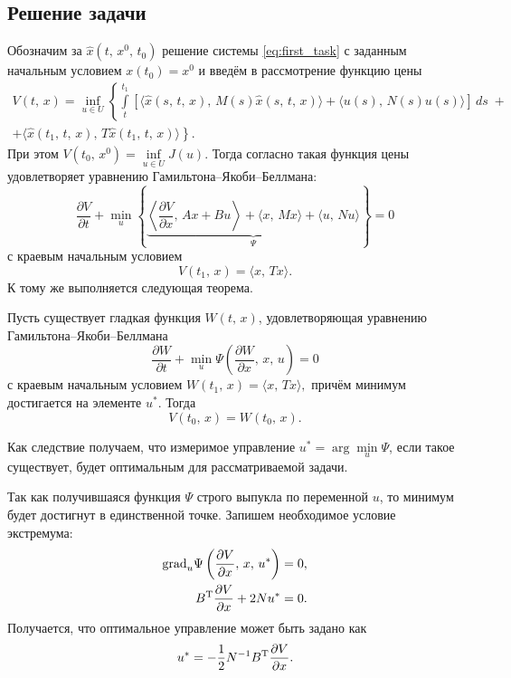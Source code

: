 \subsection{Решение задачи}
Обозначим за $\hat x(t,\,x^0,\,t_0)$ решение системы \eqref{eq:first_task} с заданным начальным условием $x(t_0) = x^0$ и введём в рассмотрение функцию цены
\begin{multline*}
        V(t,\,x)
=
\inf\limits_{u \in U} \left\{
        \int\limits_{t}^{t_1}
[
\langle
\hat x(s,\,t,\,x),\,M(s)\hat x(s,\,t,\,x)
\rangle
+
\langle
u(s),\,N(s)u(s)
\rangle
]\,ds
        \;+\right.\\+\left.
        \langle
        \hat x(t_1,\,t,\,x),\,T\hat x(t_1,\,t,\,x)
        \rangle
\right\}.
\end{multline*}
При этом $V(t_0,\,x^0) = \inf\limits_{u\in U} J(u)$. Тогда согласно \cite{krasovsky} такая функция цены удовлетворяет уравнению Гамильтона--Якоби--Беллмана:
\begin{equation}\label{eq:g-ya-b}
        \frac{\partial V}{\partial t}
        +
        \min\limits_{u}
        \left\{
        \underbrace{
\left\langle
\frac{\partial V}{\partial x}
,\,
Ax + Bu
\right\rangle
+
\langle
x,\,Mx
\rangle
+
\langle
u,\,Nu
\rangle
        }\limits_{\Psi}
        \right\}
        =
        0
\end{equation}
с краевым начальным условием
\begin{equation}\label{eq:g-ya-b-side}
        V(t_1,\,x)
        =
        \langle x,\,Tx \rangle.
\end{equation}
К тому же выполняется следующая теорема.
\begin{theorem}[О верификации]
        Пусть существует гладкая функция $W(t,\,x)$, удовлетворяющая уравнению Гамильтона--Якоби--Беллмана
$$
        \frac{\partial W}{\partial t}
        +\min\limits_{u}\Psi\left(\frac{\partial W}{\partial x},\,x,\,u\right) = 0
$$
с краевым начальным условием
$
        W(t_1,\,x) = \langle x,\,Tx \rangle,
$ причём минимум достигается на элементе $u^*$. Тогда $$V(t_0,\,x) = W(t_0,\,x).$$
\end{theorem}
Как следствие получаем, что измеримое управление $u^* = \arg\min\limits_u \Psi$, если такое существует, будет оптимальным для рассматриваемой задачи.

Так как получившаяся функция $\Psi$ строго выпукла по переменной $u$, то минимум будет достигнут в единственной точке. Запишем необходимое условие экстремума:
\begin{align*}
\mathrm{grad}_u \Psi\left(\frac{\partial V}{\partial x},\,x,\,u^*\right) &= 0,\\
B^\mathrm{T}\frac{\partial V}{\partial x} + 2Nu^* &=0. 
\end{align*}
Получается, что оптимальное управление может быть задано как
\begin{equation}
        u^* = -\frac{1}{2}N^{-1}B^\mathrm{T}\frac{\partial V}{\partial x}.
\end{equation}

